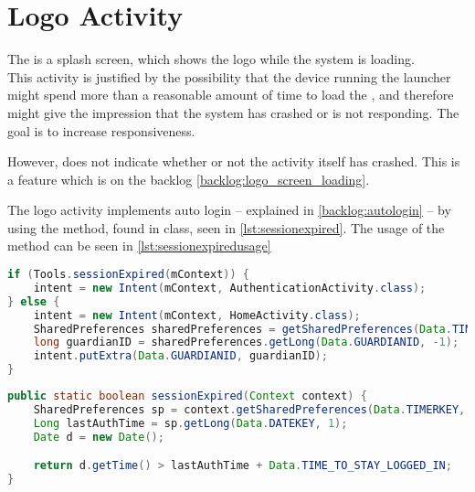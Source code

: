 \section{Logo Activity}
The  is a splash screen, which shows the \giraf[] logo while the system is loading. \\
This activity is justified by the possibility that the device running the launcher might spend more than a reasonable amount of time to load the , and therefore might give the impression that the system has crashed or is not responding. The goal is to increase responsiveness.

However,  does not indicate whether or not the activity itself has crashed. This is a feature which is on the backlog \autoref{backlog:logo_screen_loading}.

The logo activity implements auto login -- explained in \autoref{backlog:autologin} -- by using the  method, found in  class, seen in \autoref{lst:sessionexpired}.
The usage of the  method can be seen in \autoref{lst:sessionexpiredusage}

\begin{lstlisting}[style=sourceCode, language=JAVA, caption=Snippet of LogoActivity.java, label=lst:sessionexpiredusage] 
if (Tools.sessionExpired(mContext)) {
	intent = new Intent(mContext, AuthenticationActivity.class);
} else {
	intent = new Intent(mContext, HomeActivity.class);
	SharedPreferences sharedPreferences = getSharedPreferences(Data.TIMERKEY, 0);
	long guardianID = sharedPreferences.getLong(Data.GUARDIANID, -1);
	intent.putExtra(Data.GUARDIANID, guardianID);
}
\end{lstlisting}


\begin{lstlisting}[style=sourceCode, language=JAVA, caption=Snippet of Tools.java, label=lst:sessionexpired]
public static boolean sessionExpired(Context context) {
	SharedPreferences sp = context.getSharedPreferences(Data.TIMERKEY, 0);
	Long lastAuthTime = sp.getLong(Data.DATEKEY, 1);
	Date d = new Date();

	return d.getTime() > lastAuthTime + Data.TIME_TO_STAY_LOGGED_IN;
}
\end{lstlisting}